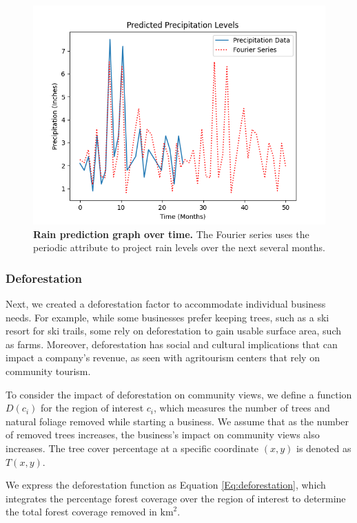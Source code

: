 \documentclass{mcmthesis}
\begin{document}
\begin{figure}[!htbp]
    \centering
    \includegraphics[scale=0.6]{figures/precipitationprediction.png}
    \caption{\textbf{Rain prediction graph over time.} The Fourier series uses the periodic attribute to project rain levels over the next several months.}
    \label{fig:RainPrediction}
\end{figure}

\subsubsection{Deforestation}
Next, we created a deforestation factor to accommodate individual business needs. For example, while some businesses prefer keeping trees, such as a ski resort for ski trails, some rely on deforestation to gain usable surface area, such as farms. Moreover, deforestation has social and cultural implications that can impact a company's revenue, as seen with agritourism centers that rely on community tourism. 

To consider the impact of deforestation on community views, we define a function $D(c_i)$ for the region of interest $c_i$, which measures the number of trees and natural foliage removed while starting a business. We assume that as the number of removed trees increases, the business's impact on community views also increases. The tree cover percentage at a specific coordinate $(x, y)$ is denoted as $T(x, y)$.


We express the deforestation function as Equation \ref{Eq:deforestation}, which integrates the percentage forest coverage over the region of interest to determine the total forest coverage removed in $\text{km}^2$.
\end{document}
